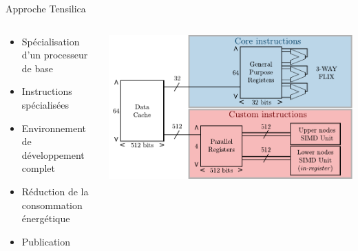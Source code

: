 \begin{frame}[c]{Approche Tensilica}
\renewcommand{\section}[2]{} %

  \begin{columns}
    \begin{column}{.48\textwidth}
    \vspace{-1cm}
      \begin{itemize}
        \item Spécialisation d'un processeur de base
        \item Instructions spécialisées
        \item Environnement de développement complet
        \item<2-> Réduction de la consommation énergétique
        \item<2-> Publication
  
      \end{itemize}
    \end{column}
    \begin{column}[T]{.48\textwidth}
    \vspace{-0.5cm}

  \begin{minipage}[c][0cm][t]{\textwidth}
    \only<+>
    { 
      \includegraphics[width=\textwidth]{./fig/archi_tensilica}
    }
    \only<+->
    {
    \begin{table}[t]
      \centering
      {\small{}}
\end{table}}
\end{minipage}
\end{column}
\end{columns}
\end{frame}
